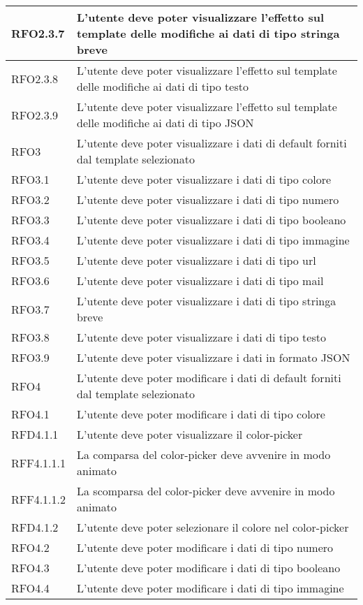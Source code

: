 \begin{longtable}{|l|m{11cm}|}
RFO2.3.7 & L'utente deve poter visualizzare l'effetto sul template delle modifiche ai dati di tipo stringa breve\\ \hline
RFO2.3.8 & L'utente deve poter visualizzare l'effetto sul template delle modifiche ai dati di tipo testo \\ \hline
RFO2.3.9 & L'utente deve poter visualizzare l'effetto sul template delle modifiche ai dati di tipo JSON \\ \hline
RFO3 & L'utente deve poter visualizzare i dati di default forniti dal template selezionato \\ \hline
RFO3.1 & L'utente deve poter visualizzare i dati di tipo colore \\ \hline
RFO3.2 & L'utente deve poter visualizzare i dati di tipo numero \\ \hline
RFO3.3 & L'utente deve poter visualizzare i dati di tipo booleano \\ \hline
RFO3.4 & L'utente deve poter visualizzare i dati di tipo immagine \\ \hline
RFO3.5 & L'utente deve poter visualizzare i dati di tipo url \\ \hline
RFO3.6 & L'utente deve poter visualizzare i dati di tipo mail \\ \hline
RFO3.7 & L'utente deve poter visualizzare i dati di tipo stringa breve \\ \hline
RFO3.8 & L'utente deve poter visualizzare i dati di tipo testo \\ \hline
RFO3.9 & L'utente deve poter visualizzare i dati in formato JSON \\ \hline
RFO4 & L'utente deve poter modificare i dati di default forniti dal template selezionato \\ \hline
RFO4.1 & L'utente deve poter modificare i dati di tipo colore \\ \hline
RFD4.1.1 & L'utente deve poter visualizzare il color-picker \\ \hline
RFF4.1.1.1 & La comparsa del color-picker deve avvenire in modo animato \\ \hline
RFF4.1.1.2 & La scomparsa del color-picker deve avvenire in modo animato \\ \hline
RFD4.1.2 & L'utente deve poter selezionare il colore nel color-picker \\ \hline
RFO4.2 & L'utente deve poter modificare i dati di tipo numero \\ \hline
RFO4.3 & L'utente deve poter modificare i dati di tipo booleano \\ \hline
RFO4.4 & L'utente deve poter modificare i dati di tipo immagine \\ \hline

\end{longtable}
